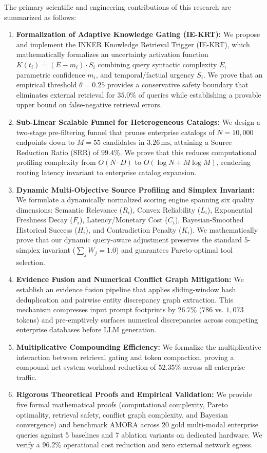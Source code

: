 The primary scientific and engineering contributions of this research are summarized as follows:
\begin{enumerate}
    \item \textbf{Formalization of Adaptive Knowledge Gating (IE-KRT):} We propose and implement the INKER Knowledge Retrieval Trigger (IE-KRT), which mathematically formalizes an uncertainty activation function $K(t_i) = (E - m_i) \cdot S_i$ combining query syntactic complexity $E$, parametric confidence $m_i$, and temporal/factual urgency $S_i$. We prove that an empirical threshold $\theta = 0.25$ provides a conservative safety boundary that eliminates external retrieval for $35.0\%$ of queries while establishing a provable upper bound on false-negative retrieval errors.
    \item \textbf{Sub-Linear Scalable Funnel for Heterogeneous Catalogs:} We design a two-stage pre-filtering funnel that prunes enterprise catalogs of $N=10,000$ endpoints down to $M=55$ candidates in $3.26\,\text{ms}$, attaining a Source Reduction Ratio ($\text{SRR}$) of $99.4\%$. We prove that this reduces computational profiling complexity from $O(N \cdot D)$ to $O(\log N + M \log M)$, rendering routing latency invariant to enterprise catalog expansion.
    \item \textbf{Dynamic Multi-Objective Source Profiling and Simplex Invariant:} We formulate a dynamically normalized scoring engine spanning six quality dimensions: Semantic Relevance ($R_i$), Convex Reliability ($L_i$), Exponential Freshness Decay ($F_i$), Latency/Monetary Cost ($C_i$), Bayesian-Smoothed Historical Success ($H_i$), and Contradiction Penalty ($K_i$). We mathematically prove that our dynamic query-aware adjustment preserves the standard 5-simplex invariant ($\sum_{j} W_j = 1.0$) and guarantees Pareto-optimal tool selection.
    \item \textbf{Evidence Fusion and Numerical Conflict Graph Mitigation:} We establish an evidence fusion pipeline that applies sliding-window hash deduplication and pairwise entity discrepancy graph extraction. This mechanism compresses input prompt footprints by $26.7\%$ ($786$ vs. $1,073$ tokens) and pre-emptively surfaces numerical discrepancies across competing enterprise databases before LLM generation.
    \item \textbf{Multiplicative Compounding Efficiency:} We formalize the multiplicative interaction between retrieval gating and token compaction, proving a compound net system workload reduction of $52.35\%$ across all enterprise traffic.
    \item \textbf{Rigorous Theoretical Proofs and Empirical Validation:} We provide five formal mathematical proofs (computational complexity, Pareto optimality, retrieval safety, conflict graph complexity, and Bayesian convergence) and benchmark AMORA across 20 gold multi-modal enterprise queries against 5 baselines and 7 ablation variants on dedicated hardware. We verify a $96.2\%$ operational cost reduction and zero external network egress.
\end{enumerate}

